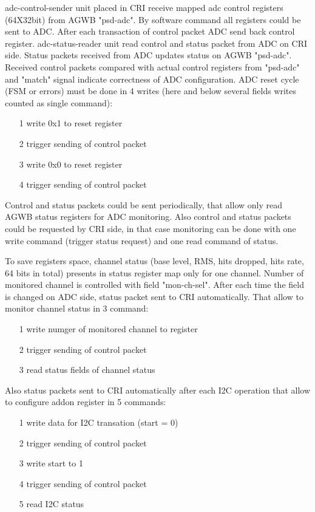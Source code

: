 \documentclass{article}
\begin{document}
adc-control-sender unit placed in CRI receive mapped adc control registers (64X32bit) from AGWB "psd-adc". By software command all registers could be sent to ADC. After each transaction of control packet ADC send back control register. adc-status-reader unit read control and status packet from ADC on CRI side. Status packets received from ADC updates status on AGWB "psd-adc". Received control packets compared with actual control registers from "psd-adc" and "match" signal indicate correctness of ADC configuration.
ADC reset cycle (FSM or errors) must be done in 4 writes (here and below several fields writes counted as single command):

\begin{itemize}
\item[1] write 0x1 to reset register
\item[2] trigger sending of control packet
\item[3] write 0x0 to reset register
\item[4] trigger sending of control packet
\end{itemize}

Control and status packets could be sent periodically, that allow only read AGWB status registers for ADC monitoring. Also control and status packets could be requested by CRI side, in that case monitoring can be done with one write command (trigger status request) and one read command of status. 

To save registers space, channel status (base level, RMS, hits dropped, hits rate, 64 bits in total) presents in status register map only for one channel. Number of monitored channel is controlled with field "mon-ch-sel". After each time the field is changed on ADC side, status packet sent to CRI automatically. That allow to monitor channel status in 3 command:

\begin{itemize}
\item[1] write numger of monitored channel to register
\item[2] trigger sending of control packet
\item[3] read status fields of channel status
\end{itemize}

Also status packets sent to CRI automatically after each I2C operation that allow to configure addon register in 5 commands:

\begin{itemize}
\item[1] write data for I2C transation (start = 0)
\item[2] trigger sending of control packet
\item[3] write start to 1
\item[4] trigger sending of control packet
\item[5] read I2C status
\end{itemize}
\end{document}
